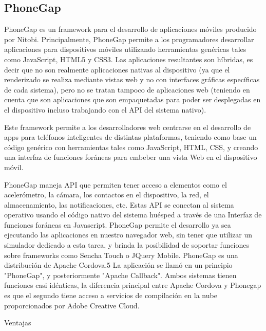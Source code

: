 \subsection{PhoneGap}

PhoneGap es un framework para el desarrollo de aplicaciones móviles producido por Nitobi. Principalmente, PhoneGap permite a los programadores desarrollar aplicaciones para dispositivos móviles utilizando herramientas genéricas tales como JavaScript, HTML5 y CSS3. Las aplicaciones resultantes son híbridas, es decir que no son realmente aplicaciones nativas al dispositivo (ya que el renderizado se realiza mediante vistas web y no con interfaces gráficas específicas de cada sistema), pero no se tratan tampoco de aplicaciones web (teniendo en cuenta que son aplicaciones que son empaquetadas para poder ser desplegadas en el dispositivo incluso trabajando con el API del sistema nativo).

Este framework permite a los desarrolladores web centrarse en el desarrollo de apps para teléfonos inteligentes de distintas plataformas, teniendo como base un código genérico con herramientas tales como JavaScript, HTML, CSS, y creando una interfaz de funciones foráneas para embeber una vista Web en el dispositivo móvil.

PhoneGap maneja API que permiten tener acceso a elementos como el acelerómetro, la cámara, los contactos en el dispositivo, la red, el almacenamiento, las notificaciones, etc. Estas API se conectan al sistema operativo usando el código nativo del sistema huésped a través de una Interfaz de funciones foráneas en Javascript.
PhoneGap permite el desarrollo ya sea ejecutando las aplicaciones en nuestro navegador web, sin tener que utilizar un simulador dedicado a esta tarea, y brinda la posibilidad de soportar funciones sobre frameworks como Sencha Touch o JQuery Mobile.
PhoneGap es una distribución de Apache Cordova.5 La aplicación se llamó en un principio "PhoneGap", y posteriormente "Apache Callback". Ambos sistemas tienen funciones casi idénticas, la diferencia principal entre Apache Cordova y Phonegap es que el segundo tiene acceso a servicios de compilación en la nube proporcionados por Adobe Creative Cloud.

Ventajas

